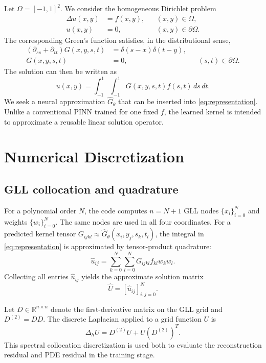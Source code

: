 \documentclass[11pt,a4paper]{article}
\newcommand{\R}{\mathbb{R}}
\newcommand{\Ghat}{\widehat{G}_{\theta}}
\begin{document}
Let $\Omega=[-1,1]^2$. We consider the homogeneous Dirichlet problem
\begin{align}
  \Delta u(x,y) &= f(x,y), && (x,y)\in\Omega, \label{eq:poisson}\\
  u(x,y) &= 0, && (x,y)\in\partial\Omega. \label{eq:bc}
\end{align}
The corresponding Green's function satisfies, in the distributional sense,
\begin{align}
  \left(\partial_{ss}+\partial_{tt}\right)G(x,y,s,t)
  &=\delta(s-x)\delta(t-y), \label{eq:greenpde}\\
  G(x,y,s,t)&=0, &&(s,t)\in\partial\Omega. \label{eq:greenbc}
\end{align}
The solution can then be written as
\begin{equation}
  u(x,y)=\int_{-1}^{1}\int_{-1}^{1}G(x,y,s,t)f(s,t)\,ds\,dt.
  \label{eq:representation}
\end{equation}
We seek a neural approximation $\Ghat$ that can be inserted into \cref{eq:representation}. Unlike a conventional PINN trained for one fixed $f$, the learned kernel is intended to approximate a reusable linear solution operator.

\section{Numerical Discretization}

\subsection{GLL collocation and quadrature}

For a polynomial order $N$, the code computes $n=N+1$ GLL nodes $\{x_i\}_{i=0}^{N}$ and weights $\{w_i\}_{i=0}^{N}$. The same nodes are used in all four coordinates. For a predicted kernel tensor
$G_{ijkl}\approx \Ghat(x_i,y_j,s_k,t_l)$, the integral in \cref{eq:representation} is approximated by tensor-product quadrature:
\begin{equation}
  \widehat{u}_{ij}
  =\sum_{k=0}^{N}\sum_{l=0}^{N}
  G_{ijkl} f_{kl} w_k w_l.
  \label{eq:quadrature}
\end{equation}
Collecting all entries \(\hat{u}_{ij}\) yields the approximate solution matrix
\begin{equation}
    \widehat{U}=[\widehat{u}_{ij}]_{i,j=0}^{N}.
\end{equation}

Let $D\in\R^{n\times n}$ denote the first-derivative matrix on the GLL grid and $D^{(2)}=D D$. The discrete Laplacian applied to a grid function $U$ is
\begin{equation}
  \Delta_h U=D^{(2)}U+U\left(D^{(2)}\right)^{\!T}.
  \label{eq:laplacian}
\end{equation}
This spectral collocation discretization is used both to evaluate the reconstruction residual and PDE residual in the training stage.
\end{document}
